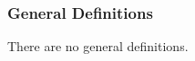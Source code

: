 \documentclass[12pt]{article}
\newcommand{\dref}[1]{GD\ref{#1}}
\newcounter{theorynum} %
\newcommand{\tmref}[1]{TM\ref{#1}}
\newcommand{\aref}[1]{A\ref{#1}}
\newcommand{\deftheory}[9][Not Applicable]
{
\noindent \rule{\textwidth}{0.5mm}
\paragraph{Number: } TM\refstepcounter{theorynum}\thetheorynum
\phantomsection \label{#2}

\paragraph{Label:} #3

\noindent \rule{\textwidth}{0.5mm}

\paragraph{Equation:}

#4

\paragraph{Description:}

#5

\paragraph{Notes:}

#6

\paragraph{Source:}

#7

\paragraph{Ref.\ By:}

#8

\paragraph{Derivation for \tmref{#2}:}

#9

\noindent \rule{\textwidth}{0.5mm}

}
\begin{document}

\subsubsection{General Definitions}\label{sec_gendef}



There are no general definitions.
\end{document}
